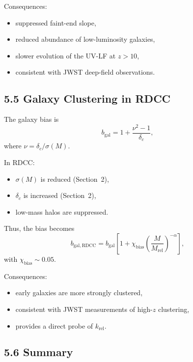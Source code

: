 \documentclass[11pt,a4paper]{article}
\begin{document}
Consequences:

\begin{itemize}
    \item suppressed faint-end slope,
    \item reduced abundance of low-luminosity galaxies,
    \item slower evolution of the UV-LF at $z > 10$,
    \item consistent with JWST deep-field observations.
\end{itemize}

\subsection*{5.5 Galaxy Clustering in RDCC}

The galaxy bias is
\begin{equation}
    b_{\mathrm{gal}}
    = 1 + \frac{\nu^2 - 1}{\delta_{c}},
\end{equation}
where $\nu = \delta_{c}/\sigma(M)$.

In RDCC:

\begin{itemize}
    \item $\sigma(M)$ is reduced (Section~2),
    \item $\delta_{c}$ is increased (Section~2),
    \item low-mass halos are suppressed.
\end{itemize}

Thus, the bias becomes
\begin{equation}
    b_{\mathrm{gal,RDCC}}
    = b_{\mathrm{gal}}
      \left[
        1 + \chi_{\mathrm{bias}}
        \left(\frac{M}{M_{\mathrm{rel}}}\right)^{-\alpha}
      \right],
\end{equation}
with $\chi_{\mathrm{bias}} \sim 0.05$.

Consequences:

\begin{itemize}
    \item early galaxies are more strongly clustered,
    \item consistent with JWST measurements of high-$z$ clustering,
    \item provides a direct probe of $k_{\mathrm{rel}}$.
\end{itemize}

\subsection*{5.6 Summary}
\end{document}
